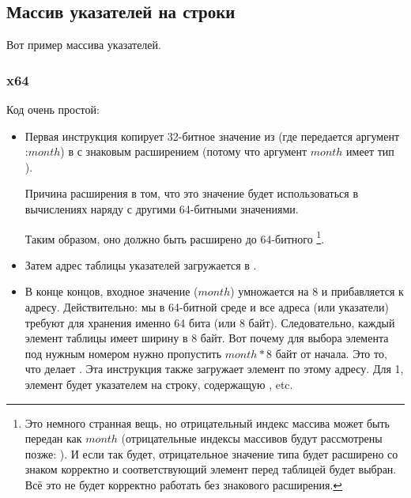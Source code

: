﻿\subsection{Массив указателей на строки}
\label{array_of_pointers_to_strings}

Вот пример массива указателей.



\subsubsection{x64}



Код очень простой:

\begin{itemize}

\item
{}
Первая инструкция  копирует 32-битное значение из \ECX (где передается аргумент :$month$)
в \RAX с знаковым расширением (потому что аргумент $month$ имеет тип \Tint).

Причина расширения в том, что это значение будет использоваться в вычислениях наряду с другими 64-битными
значениями.

Таким образом, оно должно быть расширено до 64-битного
\footnote{Это немного странная вещь, но отрицательный индекс массива может быть передан как $month$ 
(отрицательные индексы массивов будут рассмотрены позже: ).
И если так будет, отрицательное значение типа \Tint будет расширено со знаком корректно
и соответствующий элемент перед таблицей будет выбран.
Всё это не будет корректно работать без знакового расширения.}.

\item
Затем адрес таблицы указателей загружается в \RCX.

\item
В конце концов, входное значение ($month$) умножается на 8 и прибавляется к адресу.
Действительно: мы в 64-битной среде и все адреса (или указатели) 
требуют для хранения именно 64 бита (или 8 байт).
Следовательно, каждый элемент таблицы имеет ширину в 8 байт.
Вот почему для выбора элемента под нужным номером нужно пропустить $month*8$ байт от начала.
Это то, что делает \MOV.
Эта инструкция также загружает элемент по этому адресу.
Для 1, элемент будет указателем на строку, содержащую , etc.

\end{itemize}

